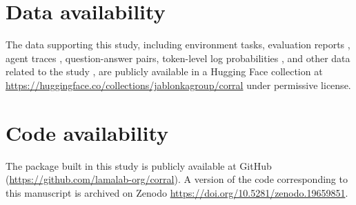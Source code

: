 \section*{Data availability}

The data supporting this study, including environment tasks\autocite{nawaf_alampara_2026_environment_tasks}, evaluation reports \autocite{lab_of_kevin_jablonka_at_uni_jena_2026_reports}, agent traces \autocite{lab_of_kevin_jablonka_at_uni_jena_2026_traces}, question-answer pairs\autocite{lab_of_kevin_jablonka_at_uni_jena_2026_qas, lab_of_kevin_jablonka_at_uni_jena_2026_qa_topic_reports, lab_of_kevin_jablonka_at_uni_jena_2026_qa_reports}, token-level log probabilities \autocite{lab_of_kevin_jablonka_at_uni_jena_2026_logprobs}, and other data related to the study \autocite{martino_rios-garcia_2026_rise, martino_rios-garcia_2026_annotation, nawaf_alampara_2026_reasoning_annotation, nawaf_alampara_2026_irt, nawaf_alampara_2026_intervention_traces, nawaf_alampara_2026_intervention_reports}, are publicly available in a Hugging Face collection at \url{https://huggingface.co/collections/jablonkagroup/corral} under permissive license.


\section*{Code availability}

The package built in this study is publicly available at GitHub (\url{https://github.com/lamalab-org/corral}). A version of the code corresponding to this manuscript is archived on Zenodo \url{https://doi.org/10.5281/zenodo.19659851}.